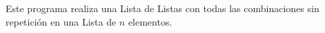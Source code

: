 Este programa realiza una Lista de Listas con todas las combinaciones sin repetición en una Lista de $n$ elementos.